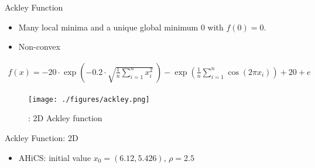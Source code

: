 \documentclass{beamer}
\newcommand{\bmx}{x}
\begin{document}
\begin{frame}{Ackley Function}
\footnotesize{
\begin{itemize}
	\item Many local minima and a unique global
minimum $0$ with $f(0)=0$.
	\item Non-convex
\end{itemize}
\vspace{-0.2cm}
\begin{align*}
	f(\bmx) =
	-20\cdot\exp\left(-0.2\cdot\sqrt{\frac{1}{n}\sum_{i=1}^n
	x_i^2}~\right)-
	\exp\left(\frac{1}{n}\sum_{i=1}^n \cos(2\pi x_i)\right)+20+e
\end{align*}
}
\vspace{-0.4cm}
\begin{figure}[!htbp]
	\centering
	  \texttt{[image: ./figures/ackley.png]}
	  \caption{: 2D Ackley function}
\end{figure}
\end{frame}

\begin{frame}{Ackley Function: 2D}
	\begin{itemize}
		\item AHiCS: initial value $x_0 = (6.12, 5.426)$, $\rho=2.5$
	\end{itemize}

\end{frame}
\end{document}
